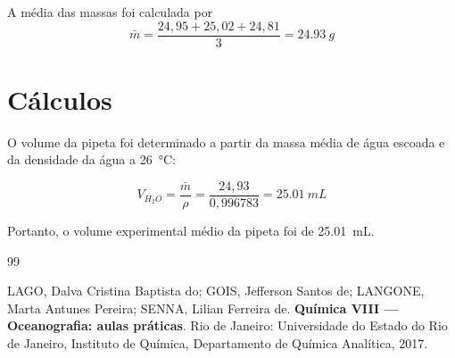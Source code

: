 \documentclass[a4paper,12pt]{article}
\begin{document}
A média das massas foi calculada por
\[
\bar{m}=\frac{24,95+25,02+24,81}{3}=\SI{24,93}{g}
\]

\section{Cálculos}

O volume da pipeta foi determinado a partir da massa média de água escoada e da densidade da água a \SI{26}{\degreeCelsius}:

\[
V_{H_2O}=\frac{\bar{m}}{\rho}
=\frac{24,93}{0,996783}
=\SI{25,01}{mL}
\]

Portanto, o volume experimental médio da pipeta foi de \SI{25,01}{mL}.

\newpage
{}
{}
\begin{thebibliography}{99}

LAGO, Dalva Cristina Baptista do;
GOIS, Jefferson Santos de;
LANGONE, Marta Antunes Pereira;
SENNA, Lilian Ferreira de.
\textbf{Química VIII — Oceanografia: aulas práticas}.
Rio de Janeiro: Universidade do Estado do Rio de Janeiro, Instituto de Química, Departamento de Química Analítica, 2017.

\end{thebibliography}
\end{document}
